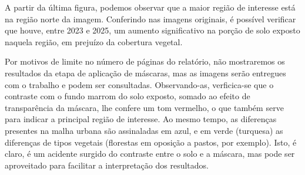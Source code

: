 \documentclass{article}
\begin{document}
A partir da última figura, podemos observar que a maior região de interesse está na região norte da imagem. Conferindo nas imagens originais, é possível verificar que houve, entre 2023 e 2025, um aumento significativo na porção de solo exposto naquela região, em prejuízo da cobertura vegetal.

Por motivos de limite no número de páginas do relatório, não mostraremos os resultados da etapa de aplicação de máscaras, mas as imagens serão entregues com o trabalho e podem ser consultadas. Observando-as, verficica-se que o contraste com o fundo marrom do solo exposto, somado ao efeito de transparência da máscara, lhe confere um tom vermelho, o que também serve para indicar a principal região de interesse. Ao mesmo tempo, as diferenças presentes na malha urbana são assinaladas em azul, e em verde (turquesa) as diferenças de tipos vegetais (florestas em oposição a pastos, por exemplo). Isto, é claro, é um acidente surgido do contraste entre o solo e a máscara, mas pode ser aproveitado para facilitar a interpretação dos resultados.



\end{document}
